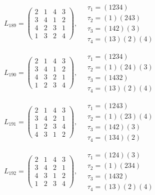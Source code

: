 $L_{189} = \begin{pmatrix} 2 & 1 & 4 & 3 \\ 3 & 4 & 1 & 2 \\ 4 & 2 & 3 & 1 \\ 1 & 3 & 2 & 4 \end{pmatrix}, \quad \begin{matrix} \tau_{1} = (1 2 3 4) \\ \tau_{2} = (1)(2 4 3) \\ \tau_{3} = (1 4 2)(3) \\ \tau_{4} = (1 3)(2)(4) \end{matrix}$

$L_{190} = \begin{pmatrix} 2 & 1 & 4 & 3 \\ 3 & 4 & 1 & 2 \\ 4 & 3 & 2 & 1 \\ 1 & 2 & 3 & 4 \end{pmatrix}, \quad \begin{matrix} \tau_{1} = (1 2 3 4) \\ \tau_{2} = (1)(2 4)(3) \\ \tau_{3} = (1 4 3 2) \\ \tau_{4} = (1 3)(2)(4) \end{matrix}$

$L_{191} = \begin{pmatrix} 2 & 1 & 4 & 3 \\ 3 & 4 & 2 & 1 \\ 1 & 2 & 3 & 4 \\ 4 & 3 & 1 & 2 \end{pmatrix}, \quad \begin{matrix} \tau_{1} = (1 2 4 3) \\ \tau_{2} = (1)(2 3)(4) \\ \tau_{3} = (1 4 2)(3) \\ \tau_{4} = (1 3 4)(2) \end{matrix}$

$L_{192} = \begin{pmatrix} 2 & 1 & 4 & 3 \\ 3 & 4 & 2 & 1 \\ 4 & 3 & 1 & 2 \\ 1 & 2 & 3 & 4 \end{pmatrix}, \quad \begin{matrix} \tau_{1} = (1 2 4)(3) \\ \tau_{2} = (1)(2 3 4) \\ \tau_{3} = (1 4 3 2) \\ \tau_{4} = (1 3)(2)(4) \end{matrix}$

